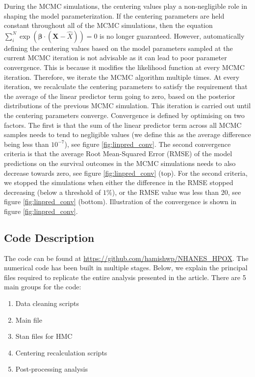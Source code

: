 \documentclass[
]{article}
\providecommand{\tightlist}{%
  \setlength{\itemsep}{0pt}\setlength{\parskip}{0pt}}
\begin{document}
During the MCMC simulations, the centering values play a non-negligible role in shaping the model parameterization. If the centering parameters are held constant throughout all of the MCMC simulations, then the equation \(\sum_i^N \exp{(\boldsymbol{\beta}\cdot(\boldsymbol{X}-\hat{X}))}=0\) is no longer guaranteed. However, automatically defining the centering values based on the model parameters sampled at the current MCMC iteration is not advisable as it can lead to poor parameter convergence. This is because it modifies the likelihood function at every MCMC iteration. Therefore, we iterate the MCMC algorithm multiple times. At every iteration, we recalculate the centering parameters to satisfy the requirement that the average of the linear predictor term going to zero, based on the posterior distributions of the previous MCMC simulation. This iteration is carried out until the centering parameters converge. Convergence is defined by optimising on two factors. The first is that the sum of the linear predictor term across all MCMC samples needs to tend to negligible values (we define this as the average difference being less than \(10^{-7}\)), see figure \ref{fig:linpred_conv}. The second convergence criteria is that the average Root Mean-Squared Error (RMSE) of the model predictions on the survival outcomes in the MCMC simulations needs to also decrease towards zero, see figure \ref{fig:linpred_conv} (top). For the second criteria, we stopped the simulations when either the difference in the RMSE stopped decreasing (below a threshold of \(1\%\)), or the RMSE value was less than 20, see figure \ref{fig:linpred_conv} (bottom). Illustration of the convergence is shown in figure \ref{fig:linpred_conv}.

\hypertarget{code-description}{%
\subsection{Code Description}\label{code-description}}

The code can be found at \url{https://github.com/hamishwp/NHANES_HPOX}. The numerical code has been built in multiple stages. Below, we explain the principal files required to replicate the entire analysis presented in the article. There are 5 main groups for the code:

\begin{enumerate}
\def\labelenumi{\arabic{enumi}.}
\tightlist
\item
  Data cleaning scripts
\item
  Main file
\item
  Stan files for HMC
\item
  Centering recalculation scripts
\item
  Post-processing analysis
\end{enumerate}
\end{document}

